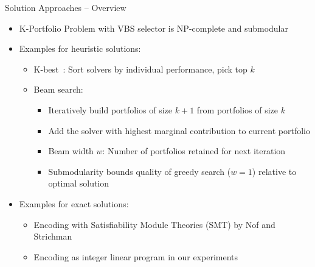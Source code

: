 \documentclass[en]{sdqbeamer}
\begin{document}
\begin{frame}[t]{Solution Approaches -- Overview}
	\begin{itemize}
		\item K-Portfolio Problem with VBS selector is NP-complete and submodular~\cite{nof2020real}
		\pause
		\vspace{\baselineskip}
		\item Examples for heuristic solutions:
		\begin{itemize}
			\item K-best~\cite{nof2020real}: Sort solvers by individual performance, pick top $k$
			\pause
			\item Beam search:
			\begin{itemize}
				\item Iteratively build portfolios of size $k+1$ from portfolios of size $k$
				\item Add the solver with highest marginal contribution to current portfolio
				\item Beam width $w$: Number of portfolios retained for next iteration
				\pause
				\item Submodularity bounds quality of greedy search ($w=1$) relative to optimal solution~\cite{nemhauser1978analysis, nof2020real}
			\end{itemize}
		\end{itemize}
		\pause
		\vspace{\baselineskip}
		\item Examples for exact solutions:
		\begin{itemize}
			\item Encoding with Satisfiability Module Theories (SMT) by Nof and Strichman~\cite{nof2020real}
			\pause
			\item Encoding as integer linear program in our experiments
		\end{itemize}
	\end{itemize}
\end{frame}
\end{document}
